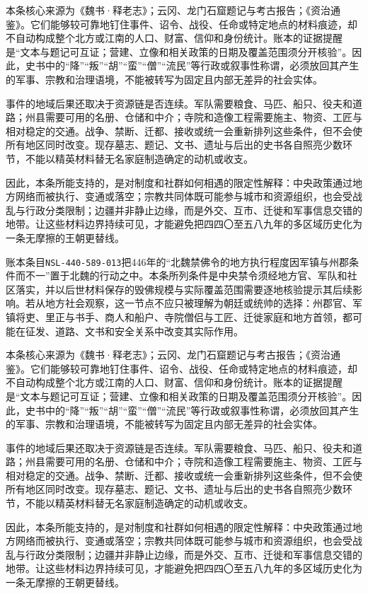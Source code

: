 本条核心来源为《魏书·释老志》；云冈、龙门石窟题记与考古报告；《资治通鉴》。它们能够较可靠地钉住事件、诏令、战役、任命或特定地点的材料痕迹，却不自动构成整个北方或江南的人口、财富、信仰和身份统计。账本的证据提醒是“文本与题记可互证；营建、立像和相关政策的日期及覆盖范围须分开核验”。因此，史书中的“降”“叛”“胡”“蛮”“僧”“流民”等行政或叙事性称谓，必须放回其产生的军事、宗教和治理语境，不能被转写为固定且内部无差异的社会实体。

事件的地域后果还取决于资源链是否连续。军队需要粮食、马匹、船只、役夫和道路；州县需要可用的名册、仓储和中介；寺院和造像工程需要施主、物资、工匠与相对稳定的交通。战争、禁断、迁都、接收或统一会重新排列这些条件，但不会使所有地区同时改变。现存墓志、题记、文书、遗址与后出的史书各自照亮少数环节，不能以精英材料替无名家庭制造确定的动机或收支。

因此，本条所能支持的，是对制度和社群如何相遇的限定性解释：中央政策通过地方网络而被执行、变通或落空；宗教共同体既可能参与城市和资源组织，也会受战乱与行政分类限制；边疆并非静止边缘，而是外交、互市、迁徙和军事信息交错的地带。让这些材料边界持续可见，才能避免把四四〇至五八九年的多区域历史化为一条无摩擦的王朝更替线。

账本条目\texttt{NSL-440-589-013}把446年的“北魏禁佛令的地方执行程度因军镇与州郡条件而不一”置于北魏的行动之中。本条所列条件是中央禁令须经地方官、军队和社区落实，并以后世材料保存的毁佛规模与实际覆盖范围需要逐地核验提示其后续影响。若从地方社会观察，这一节点不应只被理解为朝廷或统帅的选择：州郡官、军镇将吏、里正与书手、商人和船户、寺院僧侣与工匠、迁徙家庭和地方首领，都可能在征发、道路、文书和安全关系中改变其实际作用。

本条核心来源为《魏书·释老志》；云冈、龙门石窟题记与考古报告；《资治通鉴》。它们能够较可靠地钉住事件、诏令、战役、任命或特定地点的材料痕迹，却不自动构成整个北方或江南的人口、财富、信仰和身份统计。账本的证据提醒是“文本与题记可互证；营建、立像和相关政策的日期及覆盖范围须分开核验”。因此，史书中的“降”“叛”“胡”“蛮”“僧”“流民”等行政或叙事性称谓，必须放回其产生的军事、宗教和治理语境，不能被转写为固定且内部无差异的社会实体。

事件的地域后果还取决于资源链是否连续。军队需要粮食、马匹、船只、役夫和道路；州县需要可用的名册、仓储和中介；寺院和造像工程需要施主、物资、工匠与相对稳定的交通。战争、禁断、迁都、接收或统一会重新排列这些条件，但不会使所有地区同时改变。现存墓志、题记、文书、遗址与后出的史书各自照亮少数环节，不能以精英材料替无名家庭制造确定的动机或收支。

因此，本条所能支持的，是对制度和社群如何相遇的限定性解释：中央政策通过地方网络而被执行、变通或落空；宗教共同体既可能参与城市和资源组织，也会受战乱与行政分类限制；边疆并非静止边缘，而是外交、互市、迁徙和军事信息交错的地带。让这些材料边界持续可见，才能避免把四四〇至五八九年的多区域历史化为一条无摩擦的王朝更替线。


